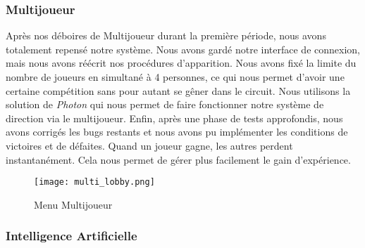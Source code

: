 \documentclass[a4paper,12pt]{article}
\newcommand{\AI}{Intelligence Artificielle}
\begin{document}
            \clearpage
            \subsubsection{Multijoueur}
                Après nos déboires de Multijoueur durant la première période, nous avons totalement repensé notre système.
                Nous avons gardé notre interface de connexion, mais nous avons réécrit nos procédures d'apparition.
                Nous avons fixé la limite du nombre de joueurs en simultané à 4 personnes, ce qui nous permet d'avoir
                une certaine compétition sans pour autant se gêner dans le circuit. Nous utilisons la solution de \textsl{Photon}
                qui nous permet de faire fonctionner notre système de direction via le multijoueur. Enfin, après une phase de 
                tests approfondis, nous avons corrigés les bugs restants et nous avons pu implémenter les conditions de victoires
                et de défaites. Quand un joueur gagne, les autres perdent instantanément. Cela nous permet de gérer plus facilement
                le gain d'expérience.
                \begin{figure}[h]
                    \centering
                    \texttt{[image: multi\_lobby.png]}
                    \caption{Menu Multijoueur}
                \end{figure}
            
            \subsubsection{\AI}
            
\end{document}
